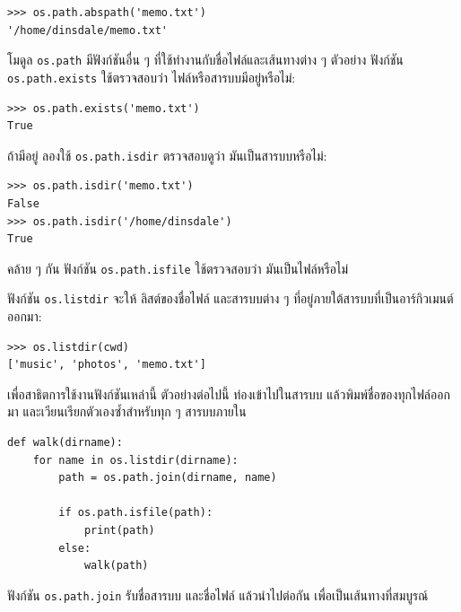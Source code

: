 \begin{verbatim}
>>> os.path.abspath('memo.txt')
'/home/dinsdale/memo.txt'
\end{verbatim}
%
%
โมดูล \texttt{os.path} มีฟังก์ชันอื่น ๆ
ที่ใช้ทำงานกับชื่อไฟล์และเส้นทางต่าง ๆ
ตัวอย่าง ฟังก์ชัน \texttt{os.path.exists} ใช้ตรวจสอบว่า
ไฟล์หรือสารบบมีอยู่หรือไม่:

\begin{verbatim}
>>> os.path.exists('memo.txt')
True
\end{verbatim}
%
%
ถ้ามีอยู่ ลองใช้ \texttt{os.path.isdir} ตรวจสอบดูว่า มันเป็นสารบบหรือไม่:

\begin{verbatim}
>>> os.path.isdir('memo.txt')
False
>>> os.path.isdir('/home/dinsdale')
True
\end{verbatim}
%
%
คล้าย ๆ กัน ฟังก์ชัน \texttt{os.path.isfile}
ใช้ตรวจสอบว่า มันเป็นไฟล์หรือไม่


ฟังก์ชัน \texttt{os.listdir} จะให้ ลิสต์ของชื่อไฟล์ และสารบบต่าง ๆ
ที่อยู่ภายใต้สารบบที่เป็นอาร์กิวเมนต์ ออกมา:

\begin{verbatim}
>>> os.listdir(cwd)
['music', 'photos', 'memo.txt']
\end{verbatim}
%
%
เพื่อสาธิตการใช้งานฟังก์ชันเหล่านี้
ตัวอย่างต่อไปนี้ ท่องเข้าไปในสารบบ แล้วพิมพ์ชื่อของทุกไฟล์ออกมา
และเวียนเรียกตัวเองซ้ำสำหรับทุก ๆ สารบบภายใน


\begin{verbatim}
def walk(dirname):
    for name in os.listdir(dirname):
        path = os.path.join(dirname, name)

        if os.path.isfile(path):
            print(path)
        else:
            walk(path)
\end{verbatim}
%
%
ฟังก์ชัน \texttt{os.path.join} รับชื่อสารบบ และชื่อไฟล์
แล้วนำไปต่อกัน เพื่อเป็นเส้นทางที่สมบูรณ์

